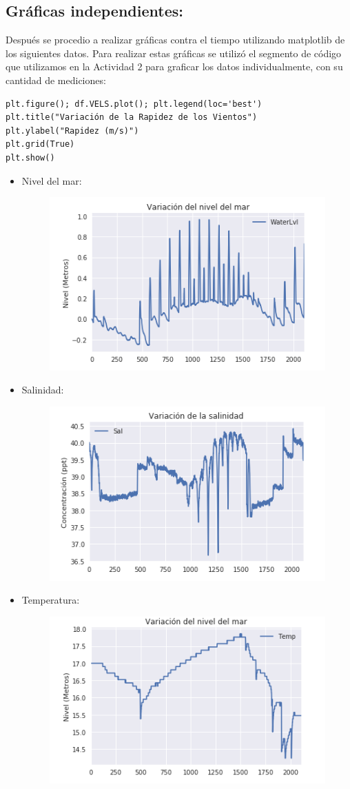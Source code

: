 \documentclass{article}
\begin{document}
\subsection{Gráficas independientes:}

Después se procedio a realizar gráficas contra el tiempo utilizando matplotlib de los siguientes datos.
Para realizar estas gráficas se utilizó el segmento de código que utilizamos en la Actividad 2 para graficar los datos individualmente, con su cantidad de mediciones:
\begin{verbatim}
plt.figure(); df.VELS.plot(); plt.legend(loc='best')
plt.title("Variación de la Rapidez de los Vientos")
plt.ylabel("Rapidez (m/s)")
plt.grid(True)
plt.show()
\end{verbatim}

\begin{itemize}
\item Nivel del mar:
\begin{figure}[ht!]
\centering
\includegraphics[width=0.4\linewidth]{nivel-tiempo.png}
\end{figure}

\item Salinidad:
\begin{figure}[h!]
\centering
\includegraphics[width=0.4\linewidth]{sal-tiempo.png}
\end{figure}

\item Temperatura:
\begin{figure}[ht!]
\centering
\includegraphics[width=0.4\linewidth]{temp-tiempo.png}
\end{figure}

\end{itemize}
\end{document}
